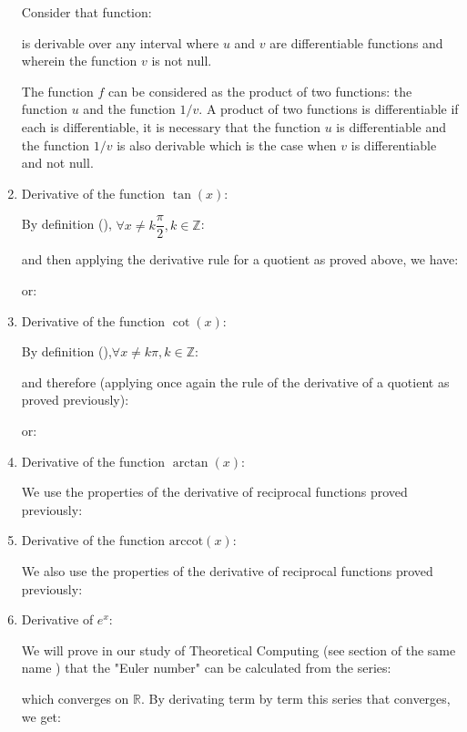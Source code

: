 \begin{enumerate}
		 	Consider that function:
		 	
		 	is derivable over any interval where $u$ and $v$ are differentiable functions and wherein the function $v$ is not null.
		 	
		 	The function $f$ can be considered as the product of two functions: the function $u$ and the function $1/v$. A product of two functions is differentiable if each is differentiable, it is necessary that the function $u$ is differentiable and the function $1/v$ is also derivable which is the case when $v$ is differentiable and not null.
		 	
		 	\item Derivative of the function $\tan(x)$:
		 	
		 	By definition (), $\forall x \neq k\dfrac{\pi}{2},k\in \mathbb{Z}$:
		 	
		 	and then applying the derivative rule for a quotient as proved above, we have:
		 	
		 	or:
		 	
		 	\item Derivative of the function $\cot(x)$:
		 	
		 	By definition (),$\forall x \neq k\pi,k\in \mathbb{Z}$:
		 	
		 	and therefore (applying once again the rule of the derivative of a quotient as proved previously):
		 	
		 	or:
		 	
		 	\item Derivative of the function  $\arctan(x)$:
		 	
		 	We use the properties of the derivative of reciprocal functions proved previously:
		 	
		 	\item Derivative of the function  $\text{arccot}(x)$:
		 	
		 	We also use the properties of the derivative of reciprocal functions proved previously:
		 	
		 	\item Derivative of $e^x$:
		 	
		 	We will prove in our study of Theoretical Computing (see section of the same name \pageref{euler number computation}) that the "Euler number" can be calculated from the series:
		 	
		 	which converges on $\mathbb{R}$. By derivating term by term this series that converges, we get:
		 	

\end{enumerate}
